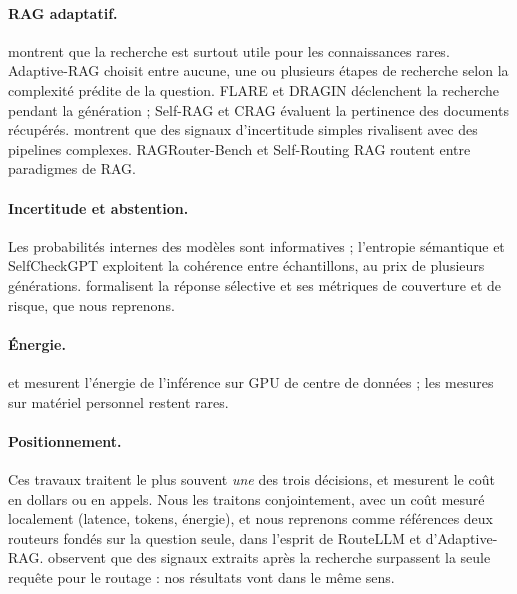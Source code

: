 \documentclass[11pt,a4paper]{article}
\begin{document}
\paragraph{RAG adaptatif.} \citet{mallen2022trust} montrent que la recherche est surtout utile pour les
connaissances rares. Adaptive-RAG \citep{jeong2024adaptiverag} choisit entre aucune, une ou plusieurs
étapes de recherche selon la complexité prédite de la question. FLARE \citep{jiang2023flare} et DRAGIN
\citep{su2024dragin} déclenchent la recherche pendant la génération ; Self-RAG \citep{asai2023selfrag} et
CRAG \citep{yan2024crag} évaluent la pertinence des documents récupérés. \citet{moskvoretskii2025adaptive}
montrent que des signaux d'incertitude simples rivalisent avec des pipelines complexes.
RAGRouter-Bench \citep{wang2026ragrouterbench} et Self-Routing RAG \citep{wu2025srrag} routent entre
paradigmes de RAG.

\paragraph{Incertitude et abstention.} Les probabilités internes des modèles sont informatives
\citep{kadavath2022know} ; l'entropie sémantique \citep{kuhn2023semantic} et SelfCheckGPT
\citep{manakul2023selfcheckgpt} exploitent la cohérence entre échantillons, au prix de plusieurs
générations. \citet{kamath2020selective} formalisent la réponse sélective et ses métriques de couverture
et de risque, que nous reprenons.

\paragraph{Énergie.} \citet{samsi2023watts} et \citet{luccioni2024power} mesurent l'énergie de
l'inférence sur GPU de centre de données ; les mesures sur matériel personnel restent rares.

\paragraph{Positionnement.} Ces travaux traitent le plus souvent \emph{une} des trois décisions, et
mesurent le coût en dollars ou en appels. Nous les traitons conjointement, avec un coût mesuré
localement (latence, tokens, énergie), et nous reprenons comme références deux routeurs fondés sur la
question seule, dans l'esprit de RouteLLM et d'Adaptive-RAG. \citet{li2026beyond} observent que des
signaux extraits après la recherche surpassent la seule requête pour le routage : nos résultats vont dans
le même sens.
\end{document}
